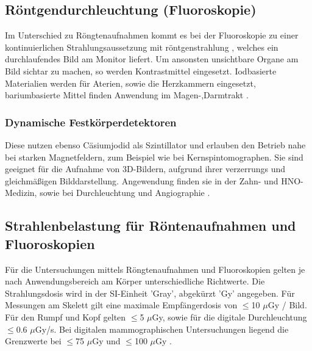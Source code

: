 \subsection{Röntgendurchleuchtung (Fluoroskopie)}
\label{sec:Fluoroskopie}
Im Unterschied zu Röngtenaufnahmen kommt es bei der Fluoroskopie zu einer kontinuierlichen Strahlungsaussetzung mit röntgenstrahlung
, welches ein durchlaufendes Bild am Monitor liefert. Um ansonsten unsichtbare Organe am Bild sichtar zu machen, so werden Kontrastmittel eingesetzt.
Iodbasierte Materialien werden für Aterien, sowie die Herzkammern eingesetzt, bariumbasierte Mittel finden Anwendung im Magen-,Darmtrakt
\cite{Artikel2}.




\subsubsection{Dynamische Festkörperdetektoren}
\label{subsubsec:Festkörperdetektoren}
Diese nutzen ebenso Cäsiumjodid als Szintillator und erlauben den Betrieb nahe bei starken Magnetfeldern, zum Beispiel
wie bei Kernspintomographen. Sie sind geeignet für die Aufnahme von 3D-Bildern, aufgrund ihrer verzerrungs und gleichmäßigen
Bilddarstellung. Angewendung finden sie in der Zahn- und HNO-Medizin, sowie bei Durchleuchtung und Angiographie 
\cite{MedizinischePhysik}.



\subsection{Strahlenbelastung für Röntenaufnahmen und Fluoroskopien}
\label{subsec:Strahlenbelastung}

Für die Untersuchungen mittels Röngtenaufnahmen und Fluoroskopien gelten je nach Anwendungsbereich am Körper unterschiedliche 
Richtwerte. Die Strahlungsdosis wird in der SI-Einheit 'Gray', abgekürzt 'Gy' angegeben. Für Messungen am Skelett gilt eine maximale
Empfängerdosis von $\leq$10 $\mu$Gy / Bild. Für den Rumpf und Kopf gelten $\leq$5 $\mu$Gy, sowie für die digitale Durchleuchtung $\leq$0.6 
 $\mu$Gy/s. Bei digitalen mammographischen Untersuchungen liegend die Grenzwerte bei $\leq$75 $\mu$Gy und $\leq$100 $\mu$Gy \cite{Artikel}.




